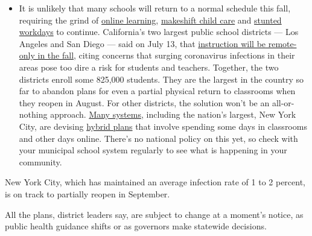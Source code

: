 \begin{itemize}
  \begin{itemize}
  \tightlist
  \item
    It is unlikely that many schools will return to a normal schedule
    this fall, requiring the grind of
    \href{https://www.nytimes3xbfgragh.onion/2020/06/05/us/coronavirus-education-lost-learning.html?action=click\&pgtype=Article\&state=default\&region=MAIN_CONTENT_3\&context=storylines_faq}{online
    learning},
    \href{https://www.nytimes3xbfgragh.onion/2020/05/29/us/coronavirus-child-care-centers.html?action=click\&pgtype=Article\&state=default\&region=MAIN_CONTENT_3\&context=storylines_faq}{makeshift
    child care} and
    \href{https://www.nytimes3xbfgragh.onion/2020/06/03/business/economy/coronavirus-working-women.html?action=click\&pgtype=Article\&state=default\&region=MAIN_CONTENT_3\&context=storylines_faq}{stunted
    workdays} to continue. California's two largest public school
    districts --- Los Angeles and San Diego --- said on July 13, that
    \href{https://www.nytimes3xbfgragh.onion/2020/07/13/us/lausd-san-diego-school-reopening.html?action=click\&pgtype=Article\&state=default\&region=MAIN_CONTENT_3\&context=storylines_faq}{instruction
    will be remote-only in the fall}, citing concerns that surging
    coronavirus infections in their areas pose too dire a risk for
    students and teachers. Together, the two districts enroll some
    825,000 students. They are the largest in the country so far to
    abandon plans for even a partial physical return to classrooms when
    they reopen in August. For other districts, the solution won't be an
    all-or-nothing approach.
    \href{https://bioethics.jhu.edu/research-and-outreach/projects/eschool-initiative/school-policy-tracker/}{Many
    systems}, including the nation's largest, New York City, are
    devising
    \href{https://www.nytimes3xbfgragh.onion/2020/06/26/us/coronavirus-schools-reopen-fall.html?action=click\&pgtype=Article\&state=default\&region=MAIN_CONTENT_3\&context=storylines_faq}{hybrid
    plans} that involve spending some days in classrooms and other days
    online. There's no national policy on this yet, so check with your
    municipal school system regularly to see what is happening in your
    community.
  \end{itemize}
\end{itemize}

New York City, which has maintained an average infection rate of 1 to 2
percent, is on track to partially reopen in September.

All the plans, district leaders say, are subject to change at a moment's
notice, as public health guidance shifts or as governors make statewide
decisions.

